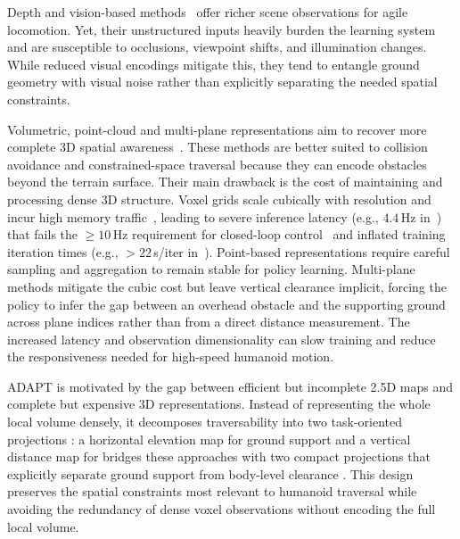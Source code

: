\documentclass[letterpaper, 10 pt, conference]{ieeeconf/ieeeconf}
\providecommand{\DIFadd}[1]{{\protect\color{blue} \sf #1}} %
\providecommand{\DIFdel}[1]{{\protect\color{red} \scriptsize #1}} %
\providecommand{\DIFaddbegin}{} %
\providecommand{\DIFaddend}{} %
\providecommand{\DIFdelbegin}{} %
\providecommand{\DIFdelend}{} %
\begin{document}
Depth and vision-based methods~\cite{zhuang2024humanoidRobot,Li_2024_MOVE,zhuang2024humanoid,Yu_2025_START,Castillo_2025_LearningTerrainAwareBipedalLocomotion,Sun_2025_DPL,Wang_2025_LocoMamba,zhu2026hiking} offer richer scene observations for agile locomotion. Yet, their unstructured inputs heavily burden the learning system and are susceptible to occlusions, viewpoint shifts, and illumination changes. While reduced visual encodings mitigate this, they tend to entangle ground geometry with visual noise rather than explicitly separating the needed spatial constraints.


Volumetric, point-cloud and multi-plane representations aim to recover more complete 3D spatial awareness~\cite{Multi-Layer_ElevationMap_2025,Ben_2025_Gallant,Niijima_2025_Real-timeMulti-PlaneSegmentation,Wang_2025_Omni-Perception,Xue_2026_Collision-FreeHumanoidTraversal}. These methods are better suited to collision avoidance and constrained-space traversal because they can encode obstacles beyond the terrain surface. Their main drawback is the cost of maintaining and processing dense 3D structure. Voxel grids scale cubically with resolution and incur high memory traffic~\cite{2020arXiv200716100T}, leading to severe inference latency (e.g., $4.4$\,Hz in~\cite{2018arXiv181205784L}) that fails the $\ge 10$\,Hz requirement for closed-loop control~\cite{2022arXiv220108117M} and inflated training iteration times (e.g., $>22$\,s/iter in~\cite{Ben_2025_Gallant}). Point-based representations require careful sampling and aggregation to remain stable for policy learning. Multi-plane methods mitigate the cubic cost but leave vertical clearance implicit, forcing the policy to infer the gap between an overhead obstacle and the supporting ground across plane indices rather than from a direct distance measurement. The increased latency and observation dimensionality can slow training and reduce the responsiveness needed for high-speed humanoid motion.

ADAPT \DIFdelbegin \DIFdel{is motivated by the gap between efficient but incomplete 2.5D maps and complete but expensive 3D representations. Instead of representing the whole local volume densely, it decomposes traversability into two task-oriented projections : a horizontal elevation map for ground support and a vertical distance map for }\DIFdelend \DIFaddbegin \DIFadd{bridges these approaches with two compact projections that explicitly separate ground support from }\DIFaddend body-level clearance \DIFdelbegin \DIFdel{. This design preserves the spatial constraints most relevant to humanoid traversal while avoiding the redundancy of dense voxel observations}\DIFdelend \DIFaddbegin \DIFadd{without encoding the full local volume}\DIFaddend .
\end{document}
